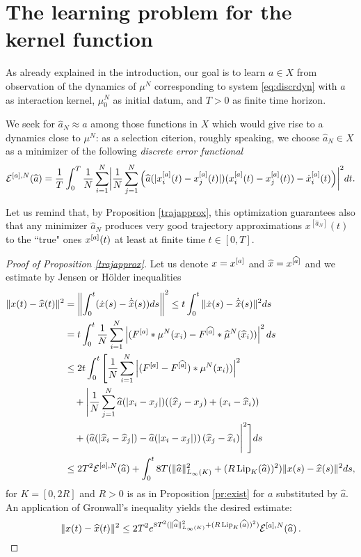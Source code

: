 
\section{The learning problem for the kernel function}\label{sec:learn}

As already explained in the introduction, our goal is to learn $a \in X$ from observation of the dynamics of $\mu^N$ corresponding to system \eqref{eq:discrdyn} with $a$ as interaction kernel, $\mu_0^N$ as initial datum, and $T>0$ as finite time horizon.

{We seek for $\widehat a_N \approx a$} among those functions in $X$ which would give rise to a dynamics close to $\mu^N$: {as a selection citerion}, roughly speaking, we choose $\widehat a_N \in X$ as a minimizer of the following \textit{discrete error functional}
\begin{align}\label{eq-def-error}
	\begin{split}
	\mathcal E^{[a],N}(\widehat a) = \frac{1}{T}\int_0^T\frac{1}{N}\sum_{i=1}^N\biggl|\frac{1}{N}\sum_{j=1}^N
			\left(\widehat a(|x^{[a]}_i(t)-x^{[a]}_j(t)|)(x^{[a]}_i(t) - x^{[a]}_j(t))-\dot{x}^{[a]}_i(t)\right)\biggr|^2 dt.
	\end{split}
\end{align}

Let us remind that, by Proposition \ref{trajapprox}, this optimization guarantees also that any minimizer $\widehat a_N$ produces very good trajectory approximations $x^{[\widehat a_N]}(t)$ to the
``true" ones $x^{[a]}(t)$ at least at finite time $t \in [0,T]$.

\begin{proof}[Proof of Proposition \ref{trajapprox}]
Let us denote $x=x^{[a]} $ and $\widehat x =x^{[\widehat a]}  $ and we estimate by Jensen or H\"older inequalities
\begin{align*}
\|x(t) - \widehat x(t) \|^2 & = \left \| \int_0^t ( \dot x(s) - \dot{\widehat x}(s)) ds \right \|^2 \leq  t \int_0^t \| \dot x(s) - \dot{\widehat x}(s) \|^2 ds \\
&=  t \int_0^t \frac{1}{N} \sum_{i=1}^N \left | (F^{[a]} * \mu^N(x_i)- F^{[\widehat a]} * \widehat \mu^N(\widehat x_i)) \right |^2 ds\\
&\leq 2 t \int_0^t \Bigg[  \frac{1}{N} \sum_{i=1}^N \left| (F^{[a]} - F^{[\widehat a]}) *  \mu^N( x_i)) \right |^2 \\
&\quad +\Bigg| \frac{1}{N} \sum_{j=1}^N \widehat a(|x_i-x_j|)( (\widehat x_j - x_j) + (x_i-\widehat x_i))  \\
&\quad+ \left(\widehat a(| \widehat x_i-\widehat x_j|) -  \widehat a(| x_i- x_j |)\right) (\widehat x_j - \widehat x_i) \Bigg|^2  \Bigg ] ds \\
&\leq 2 T^2 \mathcal E^{[a],N}(\widehat a) +  \int_0^t 8 T( \|\widehat a\|_{L_\infty(K)}^2 + (R \operatorname{Lip}_K(\widehat a) ) ^2 )\|x(s) - \widehat x(s) \|^2  ds,
\end{align*}
for $K=[0,2 R]$ and $R>0$ is as in Proposition \ref{pr:exist} for $a$ substituted by $\widehat a$.
An application of Gronwall's inequality yields the desired estimate:
$$
\|x(t) - \widehat x(t) \|^2 \leq 2 T^2   e^{8 T^2( \|\widehat a\|_{L_\infty(K)}^2 + (R \operatorname{Lip}_K(\widehat a) ) ^2)} \mathcal E^{[a],N}(\widehat a)\,.
$$
\end{proof}


